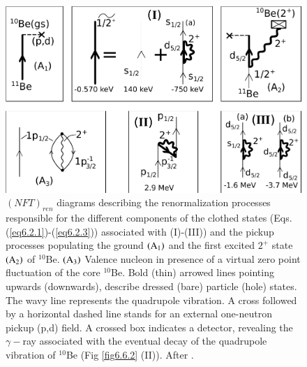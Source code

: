    \begin{figure}
   \centerline{\includegraphics*[width=12cm,angle=0]{C8/figsC8/Fig6_2_3}}
   	\caption{$(NFT)_{ren}$ diagrams describing the renormalization  processes
   	responsible for the different components of the clothed states (Eqs. (\ref{eq6.2.1})-(\ref{eq6.2.3})) associated with 
   	(I)-(III)) and the pickup processes populating the ground ${\rm  (A_1)} $ and the first excited $2^+$
   	state ${\rm (A_2)} $ of $^{10}$Be. ${\rm (A_3)} $ Valence nucleon in presence 
   	of a virtual zero point fluctuation of the core $^{10}$Be. Bold (thin) arrowed lines pointing upwards
   	(downwards), describe dressed (bare) particle (hole) states. The wavy line represents the 
   	quadrupole vibration. A cross followed by  a horizontal dashed line stands for an external one-neutron 
   	pickup (p,d) field. A crossed box indicates a detector, revealing the $\gamma-$ray
   	associated with the eventual decay of the quadrupole vibration of $^{10}$Be (Fig \ref{fig6.6.2} (II)). After \cite{Barranco:17}.}\label{fig6.2.3x}
   \end{figure} 
